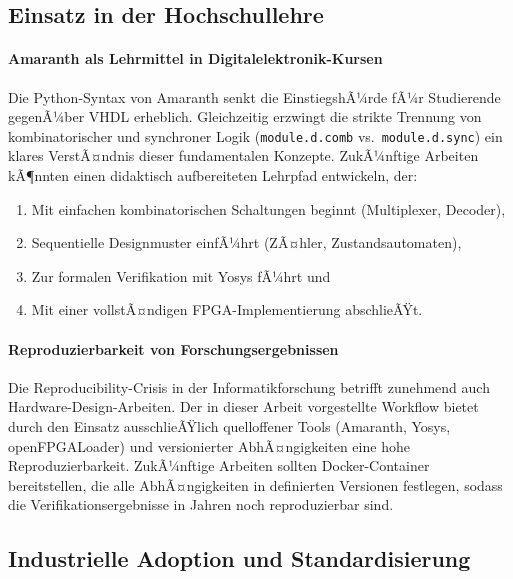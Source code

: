 ﻿\documentclass[12pt,a4paper]{report}
\begin{document}
\subsection{Einsatz in der Hochschullehre}

\paragraph{Amaranth als Lehrmittel in Digitalelektronik-Kursen}
Die Python-Syntax von Amaranth senkt die EinstiegshÃ¼rde fÃ¼r Studierende gegenÃ¼ber
VHDL erheblich. Gleichzeitig erzwingt die strikte Trennung von kombinatorischer und
synchroner Logik (\texttt{module.d.comb} vs.\ \texttt{module.d.sync}) ein klares
VerstÃ¤ndnis dieser fundamentalen Konzepte. ZukÃ¼nftige Arbeiten kÃ¶nnten einen
didaktisch aufbereiteten Lehrpfad entwickeln, der:
\begin{enumerate}
    \item Mit einfachen kombinatorischen Schaltungen beginnt (Multiplexer, Decoder),
    \item Sequentielle Designmuster einfÃ¼hrt (ZÃ¤hler, Zustandsautomaten),
    \item Zur formalen Verifikation mit Yosys fÃ¼hrt und
    \item Mit einer vollstÃ¤ndigen FPGA-Implementierung abschlieÃŸt.
\end{enumerate}

\paragraph{Reproduzierbarkeit von Forschungsergebnissen}
Die Reproducibility-Crisis in der Informatikforschung betrifft zunehmend auch
Hardware-Design-Arbeiten. Der in dieser Arbeit vorgestellte Workflow bietet durch den
Einsatz ausschlieÃŸlich quelloffener Tools (Amaranth, Yosys, openFPGALoader) und
versionierter AbhÃ¤ngigkeiten eine hohe Reproduzierbarkeit. ZukÃ¼nftige Arbeiten sollten
Docker-Container bereitstellen, die alle AbhÃ¤ngigkeiten in definierten Versionen
festlegen, sodass die Verifikationsergebnisse in Jahren noch reproduzierbar sind.

\subsection{Industrielle Adoption und Standardisierung}
\end{document}
